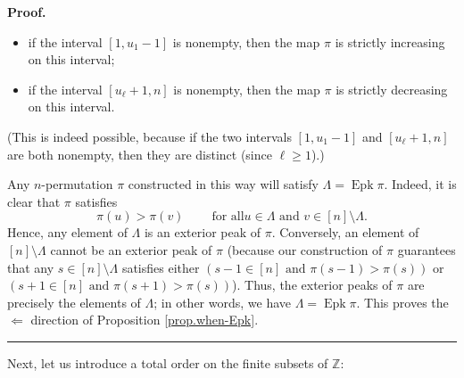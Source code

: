 \documentclass[numbers=enddot,12pt,final,onecolumn,notitlepage]{scrartcl}%
\theoremstyle{definition}
\newenvironment{proof}[1][Proof]{\noindent\textbf{#1.} }{\ \rule{0.5em}{0.5em}}
\newenvironment{verlong}{}{}
\begin{document}
\begin{verlong}
\begin{proof}
\begin{itemize}
\begin{itemize}
\item[(B)] if the interval $\left[  1,u_{1}-1\right]  $ is nonempty, then the
map $\pi$ is strictly increasing on this interval;

\item[(C)] if the interval $\left[  u_{\ell}+1,n\right]  $ is nonempty, then
the map $\pi$ is strictly decreasing on this interval.
\end{itemize}

(This is indeed possible, because if the two intervals $\left[  1,u_{1}%
-1\right]  $ and $\left[  u_{\ell}+1,n\right]  $ are both nonempty, then they
are distinct (since $\ell\geq1$).)
\end{itemize}

Any $n$-permutation $\pi$ constructed in this way will satisfy $\Lambda
=\operatorname{Epk}\pi$. Indeed, it is clear that $\pi$ satisfies%
\[
\pi\left(  u\right)  >\pi\left(  v\right)  \ \ \ \ \ \ \ \ \ \ \text{for all
}u\in\Lambda\text{ and }v\in\left[  n\right]  \setminus\Lambda.
\]
Hence, any element of $\Lambda$ is an exterior peak of $\pi$. Conversely, an
element of $\left[  n\right]  \setminus\Lambda$ cannot be an exterior peak of
$\pi$ (because our construction of $\pi$ guarantees that any $s\in\left[
n\right]  \setminus\Lambda$ satisfies either $\left(  s-1\in\left[  n\right]
\text{ and }\pi\left(  s-1\right)  >\pi\left(  s\right)  \right)  $ or
$\left(  s+1\in\left[  n\right]  \text{ and }\pi\left(  s+1\right)
>\pi\left(  s\right)  \right)  $). Thus, the exterior peaks of $\pi$ are
precisely the elements of $\Lambda$; in other words, we have $\Lambda
=\operatorname{Epk}\pi$. This proves the $\Longleftarrow$ direction of
Proposition \ref{prop.when-Epk}.
\end{proof}
\end{verlong}

Next, let us introduce a total order on the finite subsets of $\mathbb{Z}$:
\end{document}
